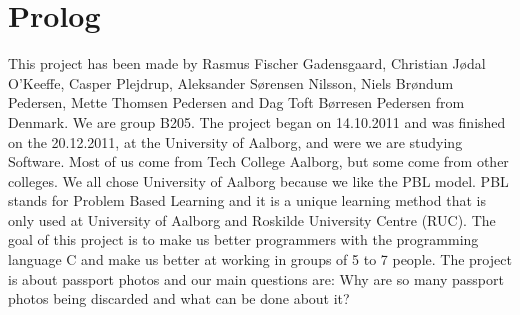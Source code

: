 \chapter{Prolog}
This project has been made by Rasmus Fischer Gadensgaard, Christian Jødal O'Keeffe, Casper Plejdrup, Aleksander Sørensen Nilsson, Niels Brøndum Pedersen, Mette Thomsen Pedersen and Dag Toft Børresen Pedersen from Denmark. We are group B205. The project began on 14.10.2011 and was finished on the 20.12.2011, at the University of Aalborg, and were we are studying Software. 
\newline
Most of us come from Tech College Aalborg, but some come from other colleges. We all chose University of Aalborg because we like the PBL model. PBL stands for Problem Based Learning and it is a unique learning method that is only used at University of Aalborg and Roskilde University Centre (RUC).
\newline
The goal of this project is to make us better programmers with the programming language C and make us better at working in groups of 5 to 7 people. The project is about passport photos and our main questions are: Why are so many passport photos being discarded and what can be done about it?